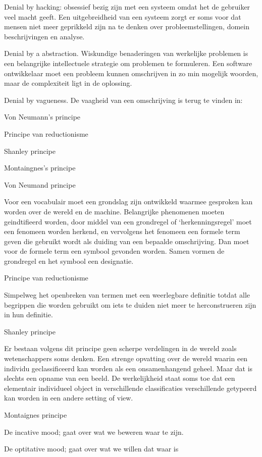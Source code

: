 Denial by hacking: obsessief bezig zijn met een systeem omdat het de gebruiker veel macht geeft. Een uitgebreidheid van een systeem zorgt er soms voor dat mensen niet meer geprikkeld zijn na te denken over probleemstellingen, domein beschrijvingen en analyse. 

Denial by a abstraction. Wiskundige benaderingen van werkelijke problemen is  een belangrijke intellectuele strategie om problemen te formuleren. Een software ontwikkelaar moet een probleem kunnen omschrijven in zo min mogelijk woorden, maar de complexiteit ligt in de oplossing. 

Denial by vagueness. De vaagheid van een omschrijving is terug te vinden in: 

Von Neumann’s principe 

Principe van reductionisme 

Shanley principe 

Montaingnes’s principe 

Von Neumand principe 

Voor een vocabulair  moet een grondslag zijn ontwikkeld waarmee gesproken kan worden over de wereld en de machine. Belangrijke phenomenen moeten geindtifieerd worden, door middel van een grondregel  of ‘herkenningsregel’ moet een fenomeen worden herkend, en vervolgens het fenomeen een formele term geven die gebruikt wordt als duiding van een bepaalde omschrijving. Dan moet voor de formele term een symbool gevonden worden. Samen vormen de grondregel en het symbool een designatie. 

Principe van reductionisme 

Simpelweg het openbreken van termen met een weerlegbare definitie totdat alle begrippen die worden gebruikt om iets te duiden  niet meer te herconstrueren zijn in hun definitie. 

Shanley principe 

Er bestaan volgens dit principe geen scherpe verdelingen in de wereld zoals wetenschappers soms denken. Een strenge opvatting over de wereld waarin een individu geclassificeerd kan worden als een onsamenhangend geheel. Maar dat is slechts een opname van een beeld. De werkelijkheid staat soms toe dat een elementair individueel object in verschillende classificaties verschillende getypeerd kan worden in een andere setting of view. 

Montaignes principe 

De incative mood; gaat over wat we beweren waar te zijn. 

De optitative mood; gaat over wat we willen dat waar is 
